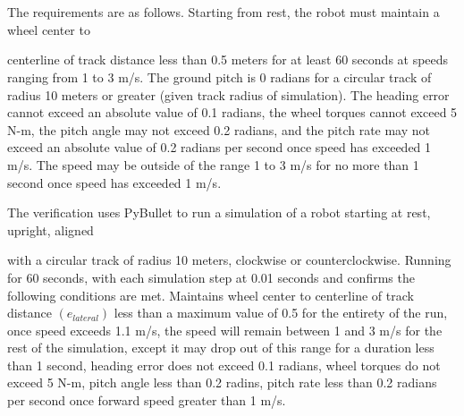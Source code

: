 \documentclass[10pt, letterbox]{article}
\begin{document}
\section{}
\begin{addmargin}[5em]{0em}
The requirements are as follows. Starting from rest, the robot must maintain a wheel center to \end{addmargin}  centerline of track distance less than 0.5 meters for at least 60 seconds at speeds ranging from 1 to 3 m/s. The ground pitch is 0 radians for a circular track of radius 10 meters or greater (given track radius of simulation). The heading error cannot exceed an absolute value of 0.1 radians, the wheel torques cannot exceed 5 N-m, the pitch angle may not exceed 0.2 radians, and the pitch rate may not exceed an absolute value of 0.2 radians per second once speed has exceeded 1 m/s. The speed may be outside of the range 1 to 3 m/s for no more than 1 second once speed has exceeded 1 m/s.
\begin{addmargin}[5em]{0em}
The verification uses PyBullet to run a simulation of a robot starting at rest, upright, aligned \end{addmargin} with a circular track of radius 10 meters, clockwise or counterclockwise. Running for 60 seconds, with each simulation step at 0.01 seconds and confirms the following conditions are met. Maintains wheel center to centerline of track distance $(e_{lateral})$ less than a maximum value of 0.5 for the entirety of the run, once speed exceeds 1.1 m/s, the speed will remain between 1 and 3 m/s for the rest of the simulation, except it may drop out of this range for a duration less than 1 second, heading error does not exceed 0.1 radians, wheel torques do not exceed 5 N-m, pitch angle less than 0.2 radins, pitch rate less than 0.2 radians per second once forward speed greater than 1 m/s.
\end{document}
